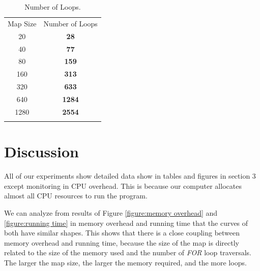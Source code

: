 \documentclass{article}
\begin{document}
\begin{table}[H]
\scriptsize
\centering
\label{table:number of loops}
\begin{tabular}{c|c}%
\hline\noalign{\smallskip}
Map Size & Number of Loops\\
\noalign{\smallskip}\hline\noalign{\smallskip}
20 & \textbf{28}\\
40 & \textbf{77}\\
80 & \textbf{159}\\
160 & \textbf{313}\\
320 & \textbf{633}\\
640 & \textbf{1284}\\
1280 & \textbf{2554}\\
\noalign{\smallskip}\hline
\end{tabular}
\caption{Number of Loops.}
\end{table}

{\centering
{}
}


\section{Discussion}
All of our experiments show detailed data show in tables and figures in section 3 except monitoring in CPU overhead. This is because our computer allocates almost all CPU resources to run the program.

We can analyze from results of Figure \ref{figure:memory overhead} and \ref{figure:running time} in memory overhead and running time that the curves of both have similar shapes. This shows that there is a close coupling between memory overhead and running time, because the size of the map is directly related to the size of the memory used and the number of \emph{FOR} loop traversals. The larger the map size, the larger the memory required, and the more loops.
\end{document}
